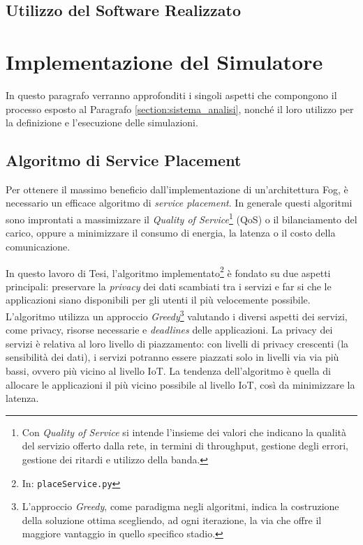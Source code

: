 \subsection{Utilizzo del Software Realizzato}


\section{Implementazione del Simulatore}

In questo paragrafo verranno approfonditi i singoli aspetti che compongono il processo esposto al Paragrafo \ref{section:sistema_analisi}, nonché il loro utilizzo per la definizione e l'esecuzione delle simulazioni.

\subsection{Algoritmo di Service Placement}

Per ottenere il massimo beneficio dall'implementazione di un'architettura Fog, è necessario un efficace algoritmo di \textit{service placement}. In generale questi algoritmi sono improntati a massimizzare il \textit{Quality of Service}\footnote{Con \textit{Quality of Service} si intende l'insieme dei valori che indicano la qualità del servizio offerto dalla rete, in termini di throughput, gestione degli errori, gestione dei ritardi e utilizzo della banda.} (QoS) o il bilanciamento del carico, oppure a minimizzare il consumo di energia, la latenza o il costo della comunicazione.

In questo lavoro di Tesi, l'algoritmo implementato\footnote{In: \texttt{placeService.py}} è fondato su due aspetti principali: preservare la \textit{privacy} dei dati scambiati tra i servizi e far si che le applicazioni siano disponibili per gli utenti il più velocemente possibile. L'algoritmo utilizza un approccio \textit{Greedy}\footnote{L'approccio \textit{Greedy}, come paradigma negli algoritmi, indica la costruzione della soluzione ottima scegliendo, ad ogni iterazione, la via che offre il maggiore vantaggio in quello specifico stadio. } valutando i diversi aspetti dei servizi, come privacy, risorse necessarie e \textit{deadlines} delle applicazioni. La privacy dei servizi è relativa al loro livello di piazzamento: con livelli di privacy crescenti (la sensibilità dei dati), i servizi potranno essere piazzati solo in livelli via via più bassi, ovvero più vicino al livello IoT. La tendenza dell'algoritmo è quella di allocare le applicazioni il più vicino possibile al livello IoT, così da minimizzare la latenza.

